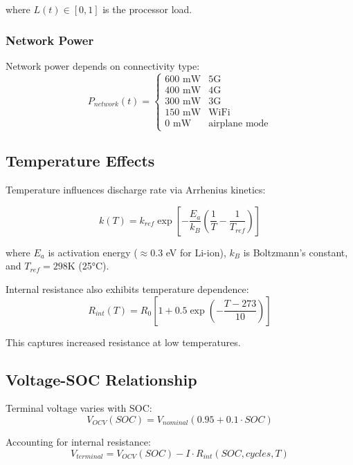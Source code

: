 \documentclass[12pt]{article}
\begin{document}
where $L(t) \in [0,1]$ is the processor load.

\subsubsection{Network Power}

Network power depends on connectivity type:
\begin{equation}
P_{network}(t) = \begin{cases}
600 \text{ mW} & \text{5G} \\
400 \text{ mW} & \text{4G} \\
300 \text{ mW} & \text{3G} \\
150 \text{ mW} & \text{WiFi} \\
0 \text{ mW} & \text{airplane mode}
\end{cases}
\end{equation}

\subsection{Temperature Effects}

Temperature influences discharge rate via Arrhenius kinetics:

\begin{equation}
k(T) = k_{ref} \exp\left[-\frac{E_a}{k_B}\left(\frac{1}{T} - \frac{1}{T_{ref}}\right)\right]
\end{equation}

where $E_a$ is activation energy ($\approx$0.3 eV for Li-ion), $k_B$ is Boltzmann's constant, and $T_{ref} = 298$K (25°C).

Internal resistance also exhibits temperature dependence:
\begin{equation}
R_{int}(T) = R_0 \left[1 + 0.5 \exp\left(-\frac{T - 273}{10}\right)\right]
\end{equation}

This captures increased resistance at low temperatures.

\subsection{Voltage-SOC Relationship}

Terminal voltage varies with SOC:
\begin{equation}
V_{OCV}(SOC) = V_{nominal}(0.95 + 0.1 \cdot SOC)
\end{equation}

Accounting for internal resistance:
\begin{equation}
V_{terminal} = V_{OCV}(SOC) - I \cdot R_{int}(SOC, cycles, T)
\end{equation}
\end{document}
